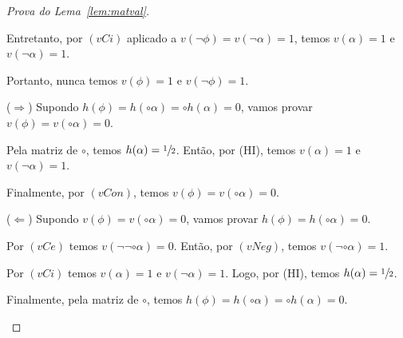 \begin{proof}[Prova do Lema~\ref{lem:matval}]
\begin{provaporcasos}
\begin{provaporsubcasos}
                        Entretanto, por $(vCi)$ aplicado a $v(\neg \phi) = v(\neg \alpha) = 1$, temos $v(\alpha) = 1$ e $v(\neg \alpha) = 1$.

                        Portanto, nunca temos $v(\phi) = 1$ e $v(\neg \phi) = 1$.

                        
                    

                        ($\Longrightarrow$) Supondo $h(\phi) = h(\circ \alpha) = \circ h(\alpha) = 0$, vamos provar $v(\phi) = v(\circ \alpha) = 0$.

                        Pela matriz de $\circ$, temos $h(\alpha) = \sfrac{1}{2}{}$. Então, por (HI), temos $v(\alpha) = 1$ e $v(\neg \alpha) = 1$. 
                        
                        Finalmente, por $(vCon)$, temos $v(\phi) = v(\circ \alpha) = 0$.
                    
                        ($\Longleftarrow$) Supondo $v(\phi) = v(\circ \alpha) = 0$, vamos provar $h(\phi) = h(\circ \alpha) = 0$.

                        Por $(vCe)$ temos $v(\neg \neg \circ \alpha) = 0$. Então, por $(vNeg)$, temos $v(\neg \circ \alpha) = 1$.

                        Por $(vCi)$ temos $v(\alpha) = 1$ e $v(\neg \alpha) = 1$. Logo, por (HI), temos $h(\alpha) = \sfrac{1}{2}{}$.

                        Finalmente, pela matriz de $\circ$, temos $h(\phi) = h(\circ \alpha) = \circ h(\alpha) = 0$.
                    
            \end{provaporsubcasos}
        


            \begin{provaporsubcasos}


\end{provaporsubcasos}
\end{provaporcasos}
\end{proof}
